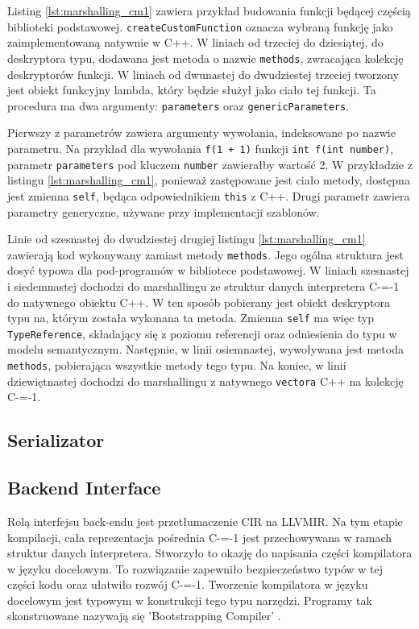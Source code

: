 Listing \ref{lst:marshalling_cm1} zawiera przykład budowania funkcji będącej częścią biblioteki podstawowej.
\lstinline{createCustomFunction} oznacza wybraną  funkcję jako zaimplementowaną natywnie w C++.
W liniach od trzeciej do dziesiątej, do deskryptora typu, dodawana jest metoda o nazwie \lstinline{methods}, zwracająca kolekcję deskryptorów funkcji.
W liniach od dwunastej do dwudziestej trzeciej tworzony jest obiekt funkcyjny lambda, który będzie służył jako ciało tej funkcji.
Ta procedura ma dwa argumenty: \lstinline{parameters} oraz \lstinline{genericParameters}.

Pierwszy z parametrów zawiera argumenty wywołania, indeksowane po nazwie parametru.
Na przykład dla wywołania \lstinline{f(1 + 1)} funkcji \lstinline{int f(int number)}, parametr \lstinline{parameters} pod kluczem \lstinline{number} zawierałby wartość 2.
W przykładzie z listingu \ref{lst:marshalling_cm1}, ponieważ zastępowane jest ciało metody, dostępna jest zmienna \lstinline{self}, będąca odpowiednikiem \lstinline{this} z C++.
Drugi parametr zawiera parametry generyczne, używane przy implementacji szablonów.

Linie od szesnastej do dwudziestej drugiej listingu \ref{lst:marshalling_cm1} zawierają kod wykonywany zamiast metody \lstinline{methods}.
Jego ogólna struktura jest dosyć typowa dla pod-programów w bibliotece podstawowej.
W liniach szesnastej i siedemnastej dochodzi do marshallingu ze struktur danych interpretera C-=-1 do natywnego obiektu C++.
W ten sposób pobierany jest obiekt deskryptora typu na, którym została wykonana ta metoda.
Zmienna \lstinline{self} ma więc typ \lstinline{TypeReference}, składający się z poziomu referencji oraz odniesienia do typu w modelu semantycznym.
Następnie, w linii osiemnastej, wywoływana jest metoda \lstinline{methods}, pobierająca wszystkie metody tego typu.
Na koniec, w linii dziewiętnastej dochodzi do marshallingu z natywnego \lstinline{vectora} C++ na kolekcję C-=-1.


\subsection{Serializator}
\label{serializer}

\subsection{Backend Interface}
\label{Backend_Interface}
Rolą interfejsu back-endu jest przetłumaczenie CIR na LLVMIR.
Na tym etapie kompilacji, cała reprezentacja pośrednia C-=-1 jest przechowywana w ramach struktur danych interpretera.
Stworzyło to okazję do napisania części kompilatora w języku docelowym.
To rozwiązanie zapewniło bezpieczeństwo typów w tej części kodu oraz ułatwiło rozwój C-=-1.
Tworzenie kompilatora w języku docelowym jest typowym w konstrukcji tego typu narzędzi.
Programy tak skonstruowane nazywają się 'Bootstrapping Compiler' \cite{puntambekar:compiler_design}. 

